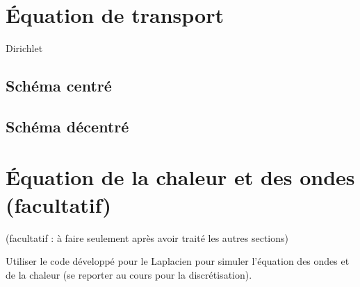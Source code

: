 \documentclass[12pt]{article}
\begin{document}
\section{\'Equation de transport}

Dirichlet

\subsection{Sch\'ema centr\'e}

\subsection{Sch\'ema d\'ecentr\'e}

\section{\'Equation de la chaleur et des ondes (facultatif)}
(facultatif : \`a faire seulement apr\`es avoir trait\'e les autres sections)

Utiliser le code d\'evelopp\'e pour le Laplacien pour simuler l'\'equation des ondes
et de la chaleur (se reporter au cours pour la discr\'etisation).
\end{document}
